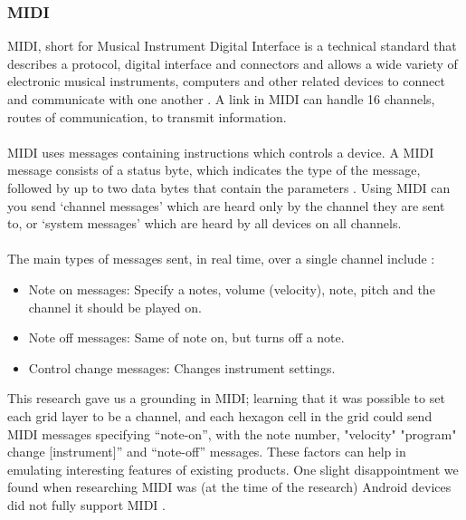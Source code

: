 \documentclass[10pt,a4paper]{article}
\begin{document}
\subsubsection{MIDI}
MIDI, short for Musical Instrument Digital Interface is a technical standard that describes a protocol, digital interface and connectors and allows a wide variety of electronic musical instruments, computers and other related devices to connect and communicate with one another \cite{swift}. A link in MIDI can handle 16 channels, routes of communication, to transmit information.\\
\\
MIDI uses messages containing instructions which controls a device. A MIDI message consists of a status byte, which indicates the type of the message, followed by up to two data bytes that contain the parameters \cite{brewster}. Using MIDI can you send ‘channel messages’ which are heard only by the channel they are sent to, or ‘system messages’ which are heard by all devices on all channels.\\
\\
The main types of messages sent, in real time, over a single channel include \cite{Huber}:
\begin{itemize}
\item Note on messages: Specify a notes, volume (velocity), note, pitch and the channel it should be played on.
\item Note off messages: Same of note on, but turns off a note.
\item Control change messages: Changes instrument settings.
\end{itemize}
This research gave us a grounding in MIDI; learning that it was possible to set each grid layer to be a channel, and each hexagon cell in the grid could send MIDI messages specifying “note-on”, with the note number, "velocity" "program" change [instrument]” and “note-off” messages. These factors can help in emulating interesting features of existing products. One slight disappointment we found when researching MIDI was (at the time of the research) Android devices did not fully support MIDI \cite{midinope}. 
\end{document}
